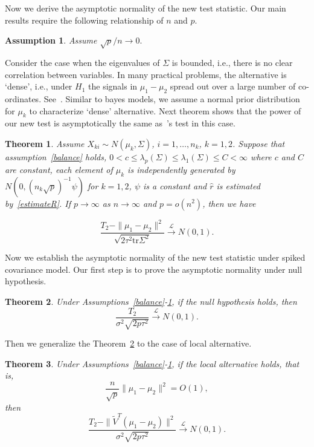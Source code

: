 \documentclass[review]{elsarticle}
\theoremstyle{plain}
\newtheorem{theorem}{\quad\quad Theorem}
\newtheorem{assumption}{\quad\quad Assumption}
\theoremstyle{definition}
\theoremstyle{remark}
\begin{document}
Now we derive the asymptotic normality of the new test statistic.
Our main results require the following relationship of $n$ and $p$.
\begin{assumption}\label{pAndN}
    Assume
    $
    {\sqrt{p}}/{n}\to 0.
    $
\end{assumption}


 Consider the case  when the eigenvalues of $\Sigma$ is bounded, i.e., there is no clear correlation between variables.
In many practical problems, the alternative is `dense', i.e., under $H_1$ the signals in $\mu_1-\mu_2$ spread out over a large number of co-ordinates. See~\cite{Tony2013}.
Similar to bayes models, we assume a normal prior distribution for $\mu_k$ to characterize `dense' alternative.
Next theorem shows that  the power of our new test is asymptotically the same as~\cite{Chen2010A}'s test in this case.


\begin{theorem}\label{sameTheorem}
   Assume $X_{ki}\sim N(\mu_k,\Sigma)$,  $i=1,\ldots,n_k$, $k=1,2$. Suppose that assumption~\ref{balance} holds, $0<c\leq\lambda_p(\Sigma)\leq\lambda_1(\Sigma)\leq C<\infty$ where $c$ and $C$ are constant, each element of $\mu_k$ is independently generated by $N(0,{(n_k\sqrt{p})}^{-1}\psi)$ for $k=1,2$, $\psi$ is a constant and  $\hat{r}$ is estimated by~\eqref{estimateR}. If $p\to\infty$ as $n\to\infty$ and $p=o(n^2)$, then we have
    
\begin{equation*}
    \frac{T_2-\|\mu_1-\mu_2\|^2}{\sqrt{2\tau^2 \mathrm{tr}\Sigma^2}} \xrightarrow{\mathcal{L}} N(0,1).
\end{equation*}
\end{theorem}


Now we establish the asymptotic normality of the new test statistic under spiked covariance model.
Our first step is to prove the asymptotic normality under null hypothesis.

\begin{theorem}\label{myPanpan}
    Under Assumptions~\ref{balance}-\ref{pAndN},
if the null hypothesis holds, then 
    \begin{equation*}
        \frac{T_2}{\sigma^2\sqrt{2p \tau^2}}\xrightarrow{\mathcal{L}}N(0,1).
    \end{equation*}
\end{theorem} 
    Then we generalize the Theorem~\ref{myPanpan} to the case of local alternative.

\begin{theorem}\label{spaceEstimation}
    Under Assumptions~\ref{balance}-\ref{pAndN},
if the local alternative holds, that is,
    $$\frac{n}{\sqrt{p}}\|\mu_1-\mu_2\|^2=O(1),$$
then 
\begin{equation*}
        \frac{T_2-\|\tilde{V}^T(\mu_1-\mu_2)\|^2}{\sigma^2\sqrt{2p\tau^2}}\xrightarrow{\mathcal{L}}N(0,1).
\end{equation*}
\end{theorem} 
\end{document}
